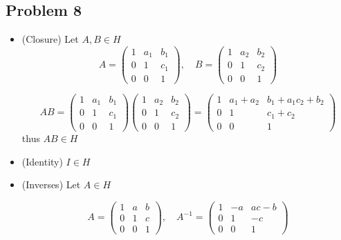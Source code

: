 \documentclass[12pt, letterpaper]{article}
\theoremstyle{definition}
\begin{document}
\subsection*{Problem 8}
\begin{itemize}
    \item (Closure) Let $A,B\in H$
    \[
    A = \begin{pmatrix}
    1 & a_1 & b_1 \\
    0 & 1 & c_1 \\
    0 & 0 & 1
    \end{pmatrix}, \quad B = \begin{pmatrix}
    1 & a_2 & b_2 \\
    0 & 1 & c_2 \\
    0 & 0 & 1
    \end{pmatrix}
    \]

    \[
    AB = \begin{pmatrix}
    1 & a_1 & b_1 \\
    0 & 1 & c_1 \\
    0 & 0 & 1
    \end{pmatrix} 
    \begin{pmatrix}
    1 & a_2 & b_2 \\
    0 & 1 & c_2 \\
    0 & 0 & 1
    \end{pmatrix}
    = \begin{pmatrix}
    1 & a_1 + a_2 & b_1 + a_1 c_2 + b_2 \\
    0 & 1 & c_1 + c_2 \\
    0 & 0 & 1
    \end{pmatrix}
    \]
    thus $AB \in H$
    \item (Identity) $I \in H$
    \item (Inverses) Let $A \in H$

    \[
    A = \begin{pmatrix} 
    1 & a & b \\
    0 & 1 & c \\
    0 & 0 & 1 
    \end{pmatrix}, \quad A^{-1} = \begin{pmatrix}
    1 & -a & ac - b \\
    0 & 1 & -c \\
    0 & 0 & 1
    \end{pmatrix}
    \]


\end{itemize}
\end{document}
